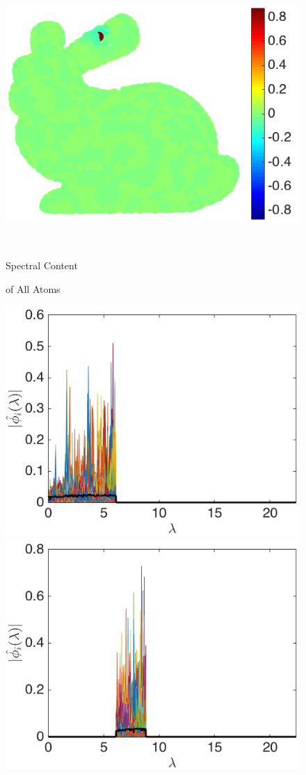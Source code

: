 \documentclass[journal, 10pt]{IEEEtran}
\begin{document}
\begin{figure}[bth]
\begin{minipage}[m]{0.16\linewidth}
\end{minipage}
\begin{minipage}[m]{0.16\linewidth}
\centerline{~~\includegraphics[width=.85\linewidth]{fig_bunny_atom_wav4a}}
\end{minipage}\\
\begin{minipage}[m]{0.16\linewidth}
\centerline{\small{Spectral Content}}
\centerline{\small{of All Atoms}}
\end{minipage}
\begin{minipage}[m]{0.16\linewidth}
\centerline{\includegraphics[width=.8\linewidth]{fig_bunny_freq_scaling3}}
\end{minipage}
\begin{minipage}[m]{0.16\linewidth}
\centerline{\includegraphics[width=.8\linewidth]{fig_bunny_freq_wav1a}}

\end{minipage}
\end{figure}
\end{document}
